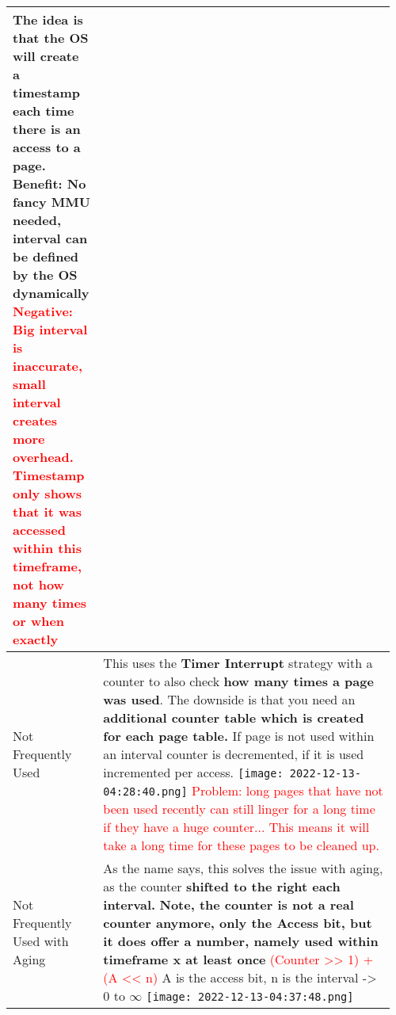 \documentclass[main.tex,fontsize=8pt,paper=a4,paper=portrait,DIV=calc,]{scrartcl}
\begin{document}
\begin{table}[ht!]
\begin{tabular}{|m{0.2\linewidth}|m{0.755\linewidth}|}
The idea is that the OS will create a timestamp each time there is an access to a page.\newline
\textcolor{OliveGreen}{Benefit: No fancy MMU needed, interval can be defined by the OS dynamically}\newline
\textcolor{red}{Negative: Big interval is inaccurate, small interval creates more overhead.\newline
Timestamp only shows that it was accessed within this timeframe, not how many times or when exactly}\\
\hline
Not Frequently Used & 
This uses the \textbf{Timer Interrupt} strategy with a counter to also check \textbf{how many times a page was used}.\newline
The downside is that you need an \textbf{additional counter table which is created for each page table.}\newline
If page is not used within an interval counter is decremented, if it is used incremented per access.\newline
\texttt{[image: 2022-12-13-04:28:40.png]}\newline 
\textcolor{red}{Problem: long pages that have not been used recently can still linger for a long time if they have a huge counter... This means it will take a long time for these pages to be cleaned up.}
\\
\hline
Not Frequently Used with Aging & 
As the name says, this solves the issue with aging, as the counter \textbf{shifted to the right each interval.}\newline
\textbf{Note, the counter is not a real counter anymore, only the Access bit, but it does offer a number, namely used within timeframe x at least once}\newline
\textcolor{red}{(Counter >> 1) + (A << n)} A is the access bit, n is the interval -> 0 to \(\infty\)\newline
\texttt{[image: 2022-12-13-04:37:48.png]}\\
\hline
\end{tabular}
\end{table}
\pagebreak
\end{document}
